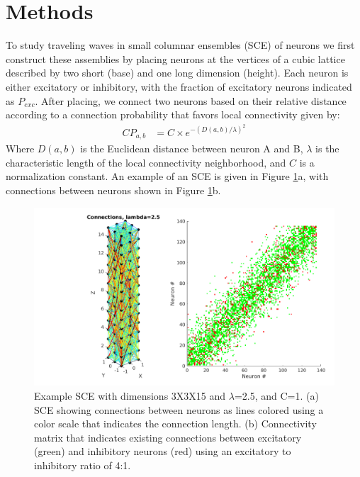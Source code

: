 \documentclass[a4paper,11pt]{article}
\begin{document}
\section{Methods}
To study traveling waves in small columnar ensembles (SCE) of neurons we first construct these assemblies by placing neurons at the vertices of a cubic lattice described by two short (base) and one long dimension (height). 
Each neuron is either excitatory or inhibitory, with the fraction of excitatory neurons indicated as $P_{exc}$.
After placing, we connect two neurons based on their relative distance according to a connection probability that favors local connectivity given by: 
\begin{align}\label{eq:connectivity}
 CP_{a,b} &= C \times e^{-(D(a,b)/\lambda)^2}
\end{align}
Where $D(a,b)$ is the Euclidean distance between neuron A and B, $\lambda$ is the characteristic length of the local connectivity neighborhood, and $C$ is a normalization constant.
An example of an SCE is given in Figure \ref{fig:column_structure}a, with connections between neurons shown in Figure \ref{fig:column_structure}b.
\begin{figure}[!htb]
 \caption{Example SCE with dimensions 3X3X15 and $\lambda$=2.5, and C=1. (a) SCE showing connections between neurons as lines colored using a color scale that indicates the connection length. (b) Connectivity matrix that indicates existing connections between excitatory (green) and inhibitory neurons (red) using an excitatory to inhibitory ratio of 4:1. }
 \label{fig:column_structure}
 \centering
   \includegraphics[width=\textwidth]{fig/lambda2}
\end{figure}
\end{document}
